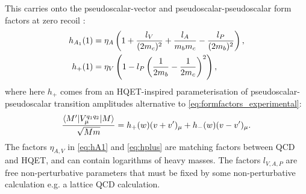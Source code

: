 This carries onto the pseudoscalar-vector and pseudoscalar-pseudoscalar form factors at zero recoil \cite{Falk:1992wt}:
\begin{align}
  \label{eq:hA1}
  h_{A_1}(1) &= \eta_A \left( 1 + {l_V\over (2m_c)^2} + {l_A\over m_b m_c} - {l_P\over (2m_b)^2} \right), \\
  h_+(1) &= \eta_V \left( 1 - l_P \left( {1\over 2m_b} - {1\over 2m_c} \right)^2 \right),
  \label{eq:hplus}
\end{align}
where here $h_+$ comes from an HQET-inspired parameterisation of pseudoscalar-pseudoscalar transition amplitudes alternative to \eqref{eq:formfactors_experimental}:
\begin{align}
  {\langle M' | V^{q_1q_2}_{\mu} | M \rangle \over \sqrt{Mm}} = h_+(w)(v+v')_{\mu} + h_-(w)(v-v')_{\mu}.
  \label{eq:pseudoscalar_hqet}
\end{align}
The factors $\eta_{A,V}$ in \eqref{eq:hA1} and \eqref{eq:hplus} are matching factors between QCD and HQET, and can contain logarithms of heavy masses. The factors $l_{V,A,P}$ are free non-perturbative parameters that must be fixed by some non-perturbative calculation e.g. a lattice QCD calculation.



